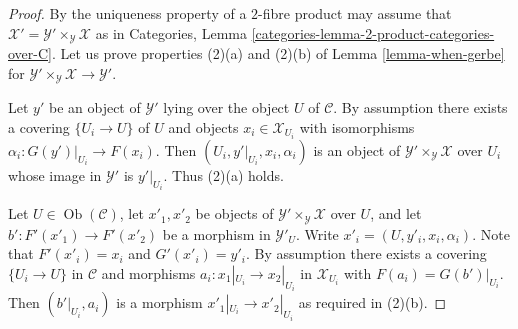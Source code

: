 \documentclass{stacks-project}
\theoremstyle{plain}
\theoremstyle{definition}
\theoremstyle{remark}
\numberwithin{equation}{subsection}
\def\Ob{\mathop{\mathrm{Ob}}\nolimits}
\begin{document}
\begin{proof}
By the uniqueness property of a $2$-fibre product may assume that
$\mathcal{X}' = \mathcal{Y}' \times_\mathcal{Y} \mathcal{X}$
as in
Categories, Lemma \ref{categories-lemma-2-product-categories-over-C}.
Let us prove properties (2)(a) and (2)(b) of
Lemma \ref{lemma-when-gerbe}
for $\mathcal{Y}' \times_\mathcal{Y} \mathcal{X} \to \mathcal{Y}'$.

\medskip\noindent
Let $y'$ be an object of $\mathcal{Y}'$ lying over the object $U$
of $\mathcal{C}$. By assumption there exists
a covering $\{U_i \to U\}$ of $U$ and objects
$x_i \in \mathcal{X}_{U_i}$ with isomorphisms
$\alpha_i : G(y')|_{U_i} \to F(x_i)$.
Then $(U_i, y'|_{U_i}, x_i, \alpha_i)$ is an object of
$\mathcal{Y}' \times_\mathcal{Y} \mathcal{X}$ over $U_i$
whose image in $\mathcal{Y}'$ is $y'|_{U_i}$. Thus (2)(a) holds.

\medskip\noindent
Let $U \in \Ob(\mathcal{C})$, let $x'_1, x'_2$ be objects of
$\mathcal{Y}' \times_\mathcal{Y} \mathcal{X}$ over $U$, and let
$b' : F'(x'_1) \to F'(x'_2)$ be a morphism in $\mathcal{Y}'_U$.
Write $x'_i = (U, y'_i, x_i, \alpha_i)$. Note that $F'(x'_i) = x_i$
and $G'(x'_i) = y'_i$. By assumption there exists
a covering $\{U_i \to U\}$ in $\mathcal{C}$ and morphisms
$a_i : x_1|_{U_i} \to x_2|_{U_i}$ in $\mathcal{X}_{U_i}$ with
$F(a_i) = G(b')|_{U_i}$. Then $(b'|_{U_i}, a_i)$ is a morphism
$x'_1|_{U_i} \to x'_2|_{U_i}$ as required in (2)(b).
\end{proof}
\end{document}
